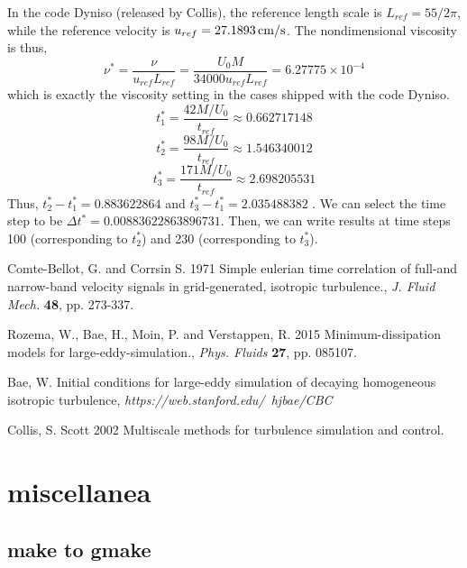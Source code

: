 \documentclass[10pt,a4paper]{article}
\begin{document}
In the code Dyniso (released by Collis), the reference length scale is $L_{ref}=55/2\pi$, while the reference velocity is $u_{ref}=27.1893\,\rm{cm/s}$. The nondimensional viscosity is thus,
$$\nu^*=\frac{\nu}{u_{ref}L_{ref}}=\frac{U_0M}{34000u_{ref}L_{ref}}=6.27775\times 10^{-4}$$ 
which is exactly the viscosity setting in the cases shipped with the code Dyniso.
$$t^*_1=\frac{42M/U_0}{t_{ref}}\approx 0.662717148$$
$$t^*_2=\frac{98M/U_0}{t_{ref}}\approx 1.546340012$$
$$t^*_3=\frac{171M/U_0}{t_{ref}}\approx 2.698205531$$
Thus, $t^*_2-t^*_1=0.883622864$ and $t^*_3-t^*_1=2.035488382$ . We can select the time step to be $\Delta t^*=0.00883622863896731$. Then, we can write results at time steps 100 (corresponding to $t^*_2$) and 230 (corresponding to $t^*_3$).

\begin{thebibliography}{99}


{Comte-Bellot, G. and Corrsin S.} 1971 {Simple eulerian time correlation of full-and narrow-band velocity signals in grid-generated, isotropic turbulence.}, {\it J. Fluid Mech. } {\bf 48}, pp. 273-337.

{Rozema, W., Bae, H., Moin, P. and Verstappen, R.} 2015 {Minimum-dissipation models for large-eddy-simulation.}, {\it Phys. Fluids } {\bf 27}, pp. 085107.

{Bae, W.} {Initial conditions for large-eddy simulation of decaying homogeneous isotropic turbulence}, {\it https://web.stanford.edu/~hjbae/CBC } 

{Collis, S. Scott} 2002 {Multiscale methods for turbulence simulation and control.}

\end{thebibliography}

\section{miscellanea}
 \subsection{make to gmake} 
 
\end{document}
